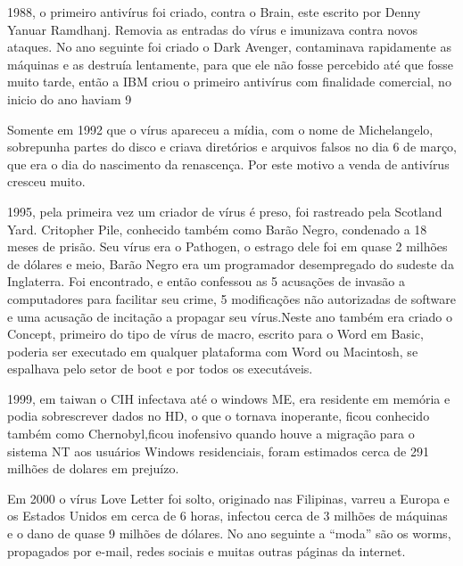 	1988, o primeiro antivírus foi criado, contra o Brain, este escrito por Denny Yanuar Ramdhanj. Removia as entradas do vírus e imunizava contra novos ataques. No ano seguinte foi criado o Dark Avenger, contaminava rapidamente as máquinas e as destruía lentamente, para que ele não fosse percebido até que fosse muito tarde, então a IBM criou o primeiro antivírus com finalidade comercial, no inicio do ano haviam 9%


	Somente em 1992 que o vírus apareceu a mídia, com o nome de Michelangelo, sobrepunha partes do disco e criava diretórios e arquivos falsos no dia 6 de março, que era o dia do nascimento da renascença. Por este motivo a venda de antivírus cresceu muito.


	1995, pela primeira vez um criador de vírus é preso, foi rastreado pela Scotland Yard. Critopher Pile, conhecido também como Barão Negro, condenado a 18 meses de prisão. Seu vírus era o Pathogen, o estrago dele foi em quase 2 milhões de dólares e meio, Barão Negro era um programador desempregado do sudeste da Inglaterra. Foi encontrado, e então confessou as 5 acusações de invasão a computadores para facilitar seu crime, 5 modificações não autorizadas de software e uma acusação de incitação a propagar seu vírus.Neste ano também era criado o Concept, primeiro do tipo de vírus de macro, escrito para o Word em Basic, poderia ser executado em qualquer plataforma com Word ou Macintosh, se espalhava pelo setor de boot e por todos os executáveis.


	1999, em taiwan  o CIH infectava até o windows ME, era residente em memória e podia sobrescrever dados no HD, o que o tornava inoperante, ficou conhecido também como Chernobyl,ficou inofensivo quando houve a migração para o sistema NT aos usuários Windows residenciais, foram estimados cerca de 291 milhões de dolares em prejuízo.


	Em 2000 o vírus Love Letter foi solto, originado nas Filipinas, varreu a Europa e os Estados Unidos em cerca de 6 horas, infectou cerca de 3 milhões de máquinas e o dano de quase 9 milhões de dólares. No ano seguinte a “moda” são os worms, propagados por e-mail, redes sociais e muitas outras páginas da internet.


